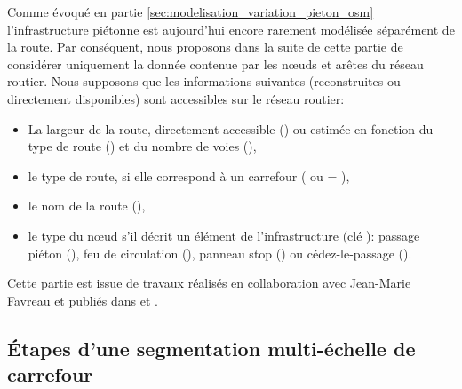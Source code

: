 \newpar{}

Comme évoqué en partie \ref{sec:modelisation_variation_pieton_osm} l'infrastructure piétonne est aujourd'hui encore rarement modélisée séparément de la route. Par conséquent, nous proposons dans la suite de cette partie de considérer uniquement la donnée contenue par les nœuds et arêtes du réseau routier. Nous supposons que les informations suivantes (reconstruites ou directement disponibles) sont accessibles sur le réseau routier:
\begin{itemize}
    \item La largeur de la route, directement accessible () ou estimée en fonction du type de route () et du nombre de voies (),
    \item le type de route, si elle correspond à un carrefour ( ou  = ),
    \item le nom de la route (),
    \item le type du nœud s'il décrit un élément de l'infrastructure (clé ): passage piéton (), feu de circulation (), panneau stop () ou cédez-le-passage ().
\end{itemize}

\newpar{}

Cette partie est issue de travaux réalisés en collaboration avec Jean-Marie Favreau et publiés dans \citep{Favreau2022} et \citep{Kalsron2022}.

\subsection{Étapes d'une segmentation multi-échelle de carrefour}

